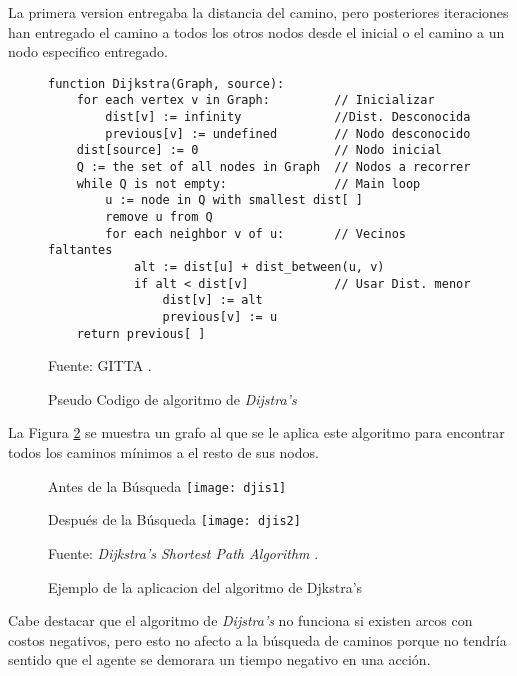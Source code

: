 La primera version entregaba la distancia del camino, pero posteriores iteraciones han entregado el camino a todos los otros nodos desde el inicial o el camino a un nodo especifico entregado.
\newline

\begin{figure}[h]
\centering
\begin{lstlisting}[frame=single]
function Dijkstra(Graph, source):
    for each vertex v in Graph:      	// Inicializar
        dist[v] := infinity             //Dist. Desconocida
        previous[v] := undefined        // Nodo desconocido
    dist[source] := 0 	                // Nodo inicial
    Q := the set of all nodes in Graph 	// Nodos a recorrer
    while Q is not empty:               // Main loop
        u := node in Q with smallest dist[ ]
        remove u from Q
        for each neighbor v of u:       // Vecinos faltantes
            alt := dist[u] + dist_between(u, v)
            if alt < dist[v]            // Usar Dist. menor
                dist[v] := alt
                previous[v] := u
    return previous[ ]
\end{lstlisting}
\caption{\label{fig:dijisCode} Pseudo Codigo de algoritmo de \textit{Dijstra's}} Fuente: GITTA \cite{Brilliant2009April}.
\end{figure}


La Figura \ref{fig:djis} se muestra un grafo al que se le aplica este algoritmo para encontrar todos los caminos mínimos a el resto de sus nodos.


\begin{figure}[h]
\begin{minipage}[c]{0.5\textwidth}
	\centering
    Antes de la Búsqueda
	\texttt{[image: djis1]}
\end{minipage}
\begin{minipage}[c]{0.5\textwidth}
	\centering
    Después de la Búsqueda
	\texttt{[image: djis2]}
\end{minipage}
\caption{\label{fig:djis} Ejemplo de la aplicacion del algoritmo de Djkstra's} \begin{center}
	Fuente: \textit{Dijkstra's Shortest Path Algorithm} \cite{Brilliant2009April}.
\end{center}
\end{figure}

Cabe destacar que el algoritmo de \textit{Dijstra's} no funciona si existen arcos con costos negativos, pero esto no afecto a la búsqueda de caminos porque no tendría sentido que el agente se demorara un tiempo negativo en una acción.


